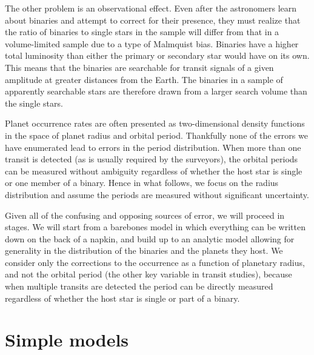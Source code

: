 \documentclass[12pt,modern]{aastex61}
\begin{document}
The other problem is an observational effect.  Even after the
astronomers learn about binaries and attempt to correct for their
presence, they must realize that the ratio of binaries to single stars
in the sample will differ from that in a volume-limited sample due to
a type of Malmquist bias.  Binaries have a higher total luminosity
than either the primary or secondary star would have on its own.  This
means that the binaries are searchable for transit signals of a given
amplitude at greater distances from the Earth.  The binaries in a
sample of apparently searchable stars are therefore drawn from a
larger search volume than the single stars.




Planet occurrence rates are often presented as two-dimensional density
functions in the space of planet radius and orbital period.
Thankfully none of the errors we have enumerated lead to errors in the
period distribution.  When more than one transit is detected (as is
usually required by the surveyors), the orbital periods can be
measured without ambiguity regardless of whether the host star is
single or one member of a binary.  Hence in what follows, we focus on
the radius distribution and assume the periods are measured without
significant uncertainty.

Given all of the confusing and opposing sources of error, we will
proceed in stages. We will start from a barebones model in which
everything can be written down on the back of a napkin, and build up
to an analytic model allowing for generality in the distribution of
the binaries and the planets they host.  We consider only the
corrections to the occurrence as a function of planetary radius, and
not the orbital period (the other key variable in transit studies),
because when multiple transits are detected the period can be directly
measured regardless of whether the host star is single or part of a
binary.


%

\section{Simple models}
\label{sec:simplest}
\end{document}
